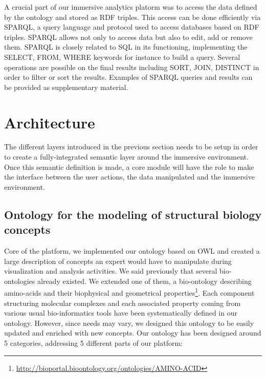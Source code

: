 \documentclass{vgtc}                          %
\begin{document}
A crucial part of our immersive analytics platorm was to access the data defined by the ontology and stored as RDF triples. This access can be done efficiently via SPARQL, a query language and protocol used to access databases based on RDF triples. SPARQL allows not only to access data but also to edit, add or remove them. 
SPARQL is closely related to SQL in its functioning, implementing the SELECT, FROM, WHERE keywords for instance to build a query. 
Several operations are possible on the final results including SORT, JOIN, DISTINCT in order to filter or sort the results. Examples of SPARQL queries and results can be provided as supplementary material.

\section{Architecture}

The different layers introduced in the previous section needs to be setup in order to create a fully-integrated semantic layer around the immersive environment. Once this semantic definition is made, a core module will have the role to make the interface between the user actions, the data manipulated and the immersive environment.

\subsection{Ontology for the modeling of structural biology concepts}

Core of the platform, we implemented our ontology based on OWL and created a large description of concepts an expert would have to manipulate during visualization and analysis activities. We said previously that several bio-ontologies already existed. We extended one of them, a bio-ontology describing amino-acids and their biophysical and geometrical properties\footnote{\url{http://bioportal.bioontology.org/ontologies/AMINO-ACID}}.
Each component structuring molecular complexes and each associated property coming from various usual bio-informatics tools have been systematically defined in our ontology. However, since needs may vary, we designed this ontology to be easily updated and enriched with new concepts.
Our ontology has been designed around 5 categories, addressing 5 different parts of our platform:
\end{document}
